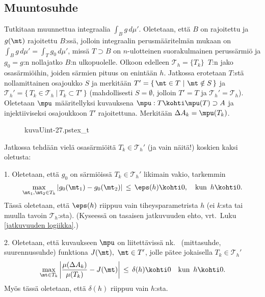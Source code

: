 \subsection{Muuntosuhde}

Tutkitaan muunnettua integraalia $\int_B g\,d\mu'$. Oletetaan, että $B$ on rajoitettu ja
$g(\mt)$ rajoitettu $B$:ssä, jolloin integraalin perusmääritelmän mukaan on
$\int_B g\,d\mu'=\int_T g_0\,d\mu'$, missä $T \supset B$ on $n$-ulotteinen suorakulmainen
perussärmiö ja $g_0=g$:n nollajatko $B$:n ulkopuolelle. Olkoon edelleen 
$\mathcal{T}_h=\{T_k\}\,$ $T$:n jako osasärmiöihin, joiden särmien pituus on enintään $h$.
Jatkossa erotetaan $T$:stä nollamittainen osajoukko $S$ ja merkitään
$T'=\{\,\mt \in T\ |\ \mt \notin S\,\}$ ja
$\mathcal{T}_h'= \{\,T_k\in\mathcal{T}_h\ |\ T_k \subset T'\,\}$ (mahdollisesti $S=\emptyset$,
jolloin $T'=T$ ja $\mathcal{T}_h'=\mathcal{T}_h$). Oletetaan $\mpu$ määritellyksi
kuvauksena $\mpu: T \kohti \mpu(T) \supset A$ ja injektiiviseksi osajoukkoon $T'$ rajoitettuna.
Merkitään $\Delta A_k=\mpu(T_k)$.
\begin{figure}[H]
\begin{center}
{kuvaUint-27.pstex_t}
\end{center}
\end{figure}
Jatkossa tehdään vielä osasärmiöitä $T_k\in\mathcal{T}_h'$ (ja vain näitä!) koskien kaksi
oletusta: 

1. Oletetaan, että $g_0$ on särmiöissä $T_k\in\mathcal{T}_h'$ likimain vakio, tarkemmin
\[
\max_{\mt_1,\mt_2 \in T_k}|g_0(\mt_1)-g_0(\mt_2)| \,\le\, \eps(h) \kohti 0, \quad 
                                                        \text{kun}\,\ h \kohti 0. 
\]
Tässä oletetaan, että $\eps(h)$ riippuu vain tiheysparametrista $h$ (ei $k$:sta tai muulla
tavoin $\mathcal{T}_h$:sta). (Kyseessä on tasaisen jatkuvuuden ehto, vrt.\
Luku \ref{jatkuvuuden logiikka}.)

2. Oletetaan, että kuvaukseen $\mpu$ on liitettävissä
%
nk.\  (mittasuhde, suurennussuhde) funktiona $J(\mt),\ \mt \in T'$, jolle
pätee jokaisella $T_k\in\mathcal{T}_h'$
\[
\max_{\mt \in T_k}\left|\frac{\mu(\Delta A_k)}{\mu(T_k)}-J(\mt)\right| 
   \,\le\,\delta(h) \kohti 0 \quad \text{kun}\,\ h \kohti 0.
\]
Myös tässä oletetaan, että $\delta(h)$ riippuu vain $h$:sta.

